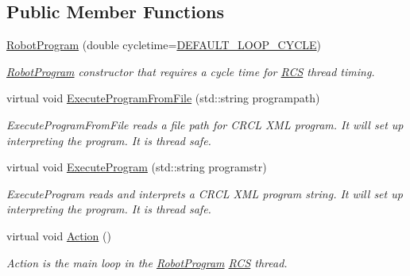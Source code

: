\subsection*{Public Member Functions}
\begin{DoxyCompactItemize}
\item 
\hyperlink{classRCS_1_1RobotProgram_a9704d21c4a2d24fc856fad7af6e99903}{Robot\-Program} (double cycletime=\hyperlink{RCS_8h_a226eb3a426e9df46b88c4ba34f217203}{D\-E\-F\-A\-U\-L\-T\-\_\-\-L\-O\-O\-P\-\_\-\-C\-Y\-C\-L\-E})
\begin{DoxyCompactList}\small\item\em \hyperlink{classRCS_1_1RobotProgram}{Robot\-Program} constructor that requires a cycle time for \hyperlink{namespaceRCS}{R\-C\-S} thread timing. \end{DoxyCompactList}\item 
virtual void \hyperlink{classRCS_1_1RobotProgram_acc1276c48a841ee5378bf58c1c8f04a2}{Execute\-Program\-From\-File} (std\-::string programpath)
\begin{DoxyCompactList}\small\item\em Execute\-Program\-From\-File reads a file path for C\-R\-C\-L X\-M\-L program. It will set up interpreting the program. It is thread safe. \end{DoxyCompactList}\item 
virtual void \hyperlink{classRCS_1_1RobotProgram_ade00f05303f43f97758cb91de8b4838b}{Execute\-Program} (std\-::string programstr)
\begin{DoxyCompactList}\small\item\em Execute\-Program reads and interprets a C\-R\-C\-L X\-M\-L program string. It will set up interpreting the program. It is thread safe. \end{DoxyCompactList}\item 
virtual void \hyperlink{classRCS_1_1RobotProgram_a637f6305bb0beea4a9140b18b245790e}{Action} ()
\begin{DoxyCompactList}\small\item\em Action is the main loop in the \hyperlink{classRCS_1_1RobotProgram}{Robot\-Program} \hyperlink{namespaceRCS}{R\-C\-S} thread. \end{DoxyCompactList}\end{DoxyCompactItemize}
